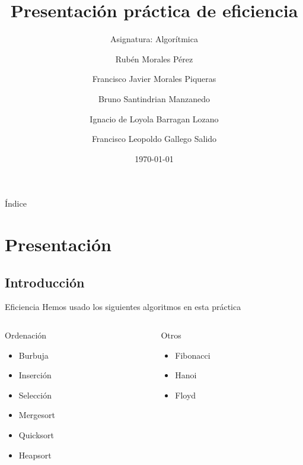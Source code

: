 \documentclass[compress]{beamer}
\title{Presentación práctica de eficiencia}                                               %
\subtitle{Asignatura: Algorítmica}                                  %
\author{Rubén Morales Pérez
		\and Francisco Javier Morales Piqueras
		\and Bruno Santindrian Manzanedo
		\and Ignacio de Loyola Barragan Lozano
		\and Francisco Leopoldo Gallego Salido}
\date{\today}                                                            %
\begin{document}
\begin{frame}
\titlepage
\end{frame}
\begin{frame}{Índice}
  \hypertarget{index}{}
  \tableofcontents
\end{frame}


\section{Presentación}
\subsection{Introducción}
\begin{frame}
	\begin{block}{Eficiencia}
	Hemos usado los siguientes algoritmos en esta práctica
	\end{block}
	
\begin{columns}  
\begin{column}{5cm}   
	\vspace*{1cm}
	\begin{block}{Ordenaci\'on} 
	\begin{itemize}
		\item Burbuja
		\item Inserción
		\item Selección
		\item Mergesort
		\item Quicksort
		\item Heapsort
	\end{itemize}      
	\end{block}            
\end{column}	

\begin{column}{5cm} 
	\begin{block}{Otros}
	\begin{itemize}
		\item Fibonacci
		\item Hanoi
		\item Floyd
	\end{itemize}    
	\end{block}	                 
\end{column}  
\end{columns}	
\end{frame}
\end{document}
